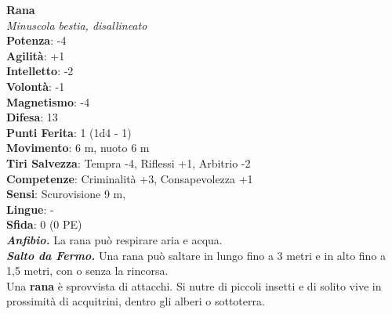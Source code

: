 \begin{multicols}{2}
\medskip\textbf{Rana}\\
\emph{Minuscola bestia, disallineato}\\
\textbf{Potenza}: -4\\
\textbf{Agilità}: +1\\
\textbf{Intelletto}: -2\\
\textbf{Volontà}: -1\\
\textbf{Magnetismo}: -4\\
\textbf{Difesa}: 13\\
\textbf{Punti Ferita}: 1 (1d4 - 1)\\
\textbf{Movimento}: 6 m, nuoto 6 m\\
\textbf{Tiri Salvezza}:  Tempra -4, Riflessi +1, Arbitrio -2 \\
\textbf{Competenze}: Criminalità +3, Consapevolezza +1\\
\textbf{Sensi}: Scurovisione 9 m, \\
\textbf{Lingue}: -\\
\textbf{Sfida}: 0 (0 PE)\smallskip\\
\emph{\textbf{Anfibio.}} La rana può respirare aria e acqua.\\
\emph{\textbf{Salto da Fermo.}} Una rana può saltare in lungo fino a 3 metri e in alto fino a 1,5 metri, con o senza la rincorsa.\\
Una \textbf{rana} è sprovvista di attacchi. Si nutre di piccoli insetti e di solito vive in prossimità di acquitrini, dentro gli alberi o sottoterra.\\


\end{multicols}
